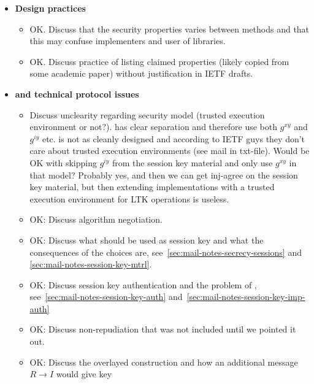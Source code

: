 \documentclass[runningheads,draft,x11names]{llncs}
\begin{document}
{\begin{itemize}
        \begin{itemize}
            \item{\textbf{Design practices}}
                \begin{itemize}
                \item OK. Discuss that the security properties varies between methods
                and that this may confuse implementers and user of libraries.
                \item OK. Discuss practice of listing claimed properties (likely copied
                from some academic paper) without justification in IETF drafts.
                \end{itemize}
            \item{\textbf{\mGiy and technical protocol issues}}
                \begin{itemize}
                \item Discuss unclearity regarding security model (trusted execution
                environment or not?). \mOptls has clear separation and therefore
                use both $g^{xy}$ and $g^{iy}$ etc. \mEdhoc{} is not as cleanly
                designed and according to IETF guys they don't care about
                trusted execution environments (see mail in txt-file).
                Would \mEdhoc{} be OK with skipping $g^{iy}$ from the session key
                material and only use $g^{xy}$ in that model? Probably yes, and
                then we can get inj-agree on the session key material, but then
                extending \mEdhoc{} implementations with a trusted execution
                environment for LTK operations is useless.
                \item OK: Discuss algorithm negotiation.
                \item OK: Discuss what should be used as session key and what the
                consequences of the choices are,
                see~\ref{sec:mail-notes-secrecy-sessions} and
                \ref{sec:mail-notes-session-key-mtrl}.
                \item OK: Discuss session key authentication and the problem of \mGiy,
                see~\ref{sec:mail-notes-session-key-auth}
                and~\ref{sec:mail-notes-session-key-imp-auth}
                \item OK: Discuss non-repudiation that was not included until we pointed
                it out.
                \item OK: Discuss the overlayed \mOptls construction and how an
                additional \mOscore message $R \rightarrow I$ would give key

\end{itemize}
\end{itemize}
\end{itemize}}
\end{document}
